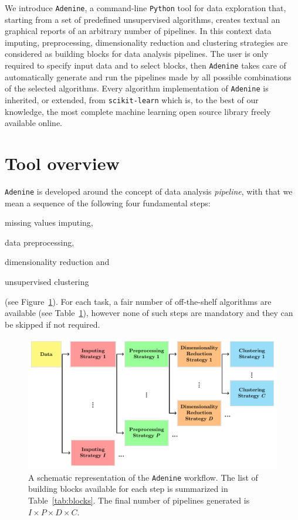 \documentclass[twoside,11pt]{article}
\makeatletter
\newcommand{\ade}{\texttt{Adenine}\@\xspace}
\newcommand{\py}{\texttt{Python}\@\xspace}
\makeatother
\begin{document}
We introduce \ade, a command-line \py tool for data exploration that, starting from a set of predefined unsupervised algorithms, creates textual an graphical reports of an arbitrary number of pipelines. In this context data imputing, preprocessing, dimensionality reduction and clustering strategies are considered as building blocks for data analysis pipelines. The user is only required to specify input data and to select blocks, then \ade takes care of automatically generate and run the pipelines made by all possible combinations of the selected algorithms. Every algorithm implementation of \ade is inherited, or extended, from \texttt{scikit-learn} \citep{scikit-learn} which is, to the best of our knowledge, the most complete machine learning open source library freely available online.


\section{Tool overview}\label{sec:implem}
\ade is developed around the concept of data analysis \emph{pipeline}, with that we mean a sequence of the following four fundamental steps:
\begin{enumerate*}[label=(\roman*)]
  \item missing values imputing,
  \item data preprocessing,
  \item dimensionality reduction and
  \item unsupervised clustering
\end{enumerate*} (see Figure~\ref{fig:workflow}).
For each task, a fair number of off-the-shelf algorithms are available (see Table~\ref{sec:implem}), however none of such steps are mandatory and they can be skipped if not required.

\begin{figure}[h!]
    \centering
    \includegraphics[width=\textwidth]{ade_wf/ade_wf.pdf}
    \caption{A schematic representation of the \ade workflow. The list of building blocks available for each step is summarized in Table~\ref{tab:blocks}. The final number of pipelines generated is $I \times P \times D \times C$.}\label{fig:workflow}
\end{figure}
\end{document}
